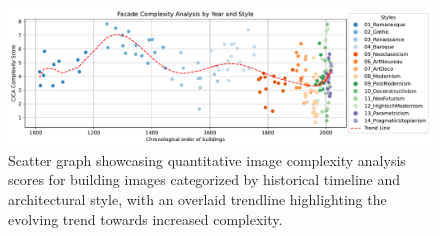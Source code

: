 \documentclass[final,5p,times]{elsarticle}%
\begin{document}
\begin{linenumbers}
            \begin{figure}[htb]
                  \centering
                  \includegraphics[width= \linewidth]{Graphs/complexitygraph}
                  \caption{Scatter graph showcasing quantitative image complexity analysis scores for building images categorized by historical timeline and architectural style, with an overlaid trendline highlighting the evolving trend towards increased complexity.}
                  \label{fig:HistoricalComplexityGraph}
            \end{figure}


\end{linenumbers}
\end{document}
